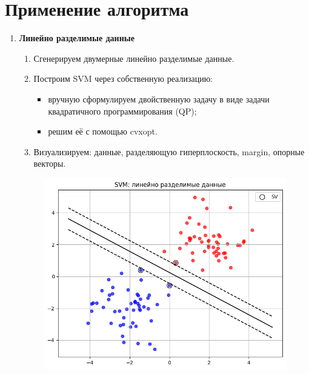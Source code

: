 \section{Применение алгоритма}

\begin{enumerate}
    \item \textbf{Линейно разделимые данные}

    \begin{enumerate}
        \item Сгенерируем двумерные линейно разделимые данные.
        \item Построим SVM через собственную реализацию:
        \begin{itemize}
            \item вручную сформулируем двойственную задачу в виде задачи квадратичного
программирования (QP);
            \item решим её с помощью cvxopt.
        \end{itemize}
        \item Визуализируем: данные, разделяющую гиперплоскость, margin, опорные векторы.
        
    
\end{enumerate}
    \begin{figure}[H]
        \centering
        \includegraphics[width=0.75\linewidth]{assets/1.png}
        \caption {}
    \end{figure}


\end{enumerate}
